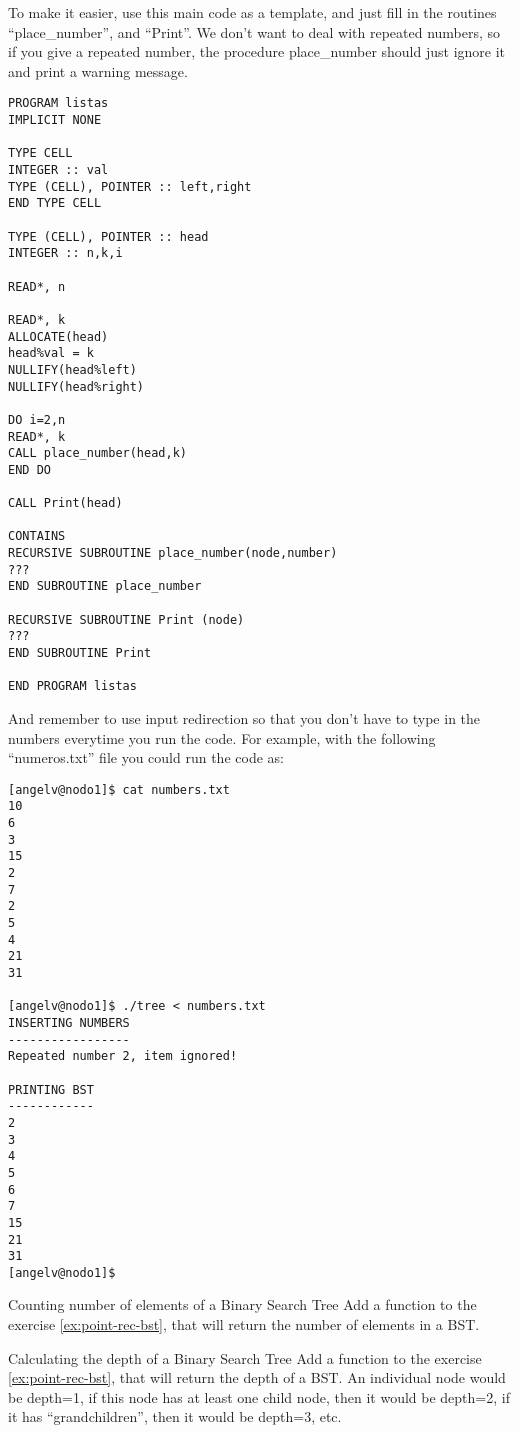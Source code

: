 To make it easier, use this main code as a template, and just fill in the
routines ``place\_number'', and ``Print''. We don't want to deal with repeated
numbers, so if you give a repeated number, the procedure place\_number should
just ignore it and print a warning message.

\begin{verbatim}
PROGRAM listas
IMPLICIT NONE

TYPE CELL
INTEGER :: val
TYPE (CELL), POINTER :: left,right
END TYPE CELL

TYPE (CELL), POINTER :: head
INTEGER :: n,k,i

READ*, n

READ*, k
ALLOCATE(head)
head%val = k
NULLIFY(head%left)
NULLIFY(head%right)

DO i=2,n
READ*, k
CALL place_number(head,k)
END DO

CALL Print(head)

CONTAINS 
RECURSIVE SUBROUTINE place_number(node,number)
???
END SUBROUTINE place_number

RECURSIVE SUBROUTINE Print (node) 
???
END SUBROUTINE Print

END PROGRAM listas
\end{verbatim}

And remember to use input redirection so that you don't have to type in the
numbers everytime you run the code. For example, with the following
``numeros.txt'' file you could run the code as:

\begin{verbatim}
[angelv@nodo1]$ cat numbers.txt
10
6
3
15
2
7
2
5
4
21
31

[angelv@nodo1]$ ./tree < numbers.txt
INSERTING NUMBERS
-----------------
Repeated number 2, item ignored!

PRINTING BST
------------
2
3
4
5
6
7
15
21
31
[angelv@nodo1]$
\end{verbatim}

 {Counting number of elements of a Binary Search Tree}
\label{ex:point-rec-nnodes-bst}
Add a function to the exercise \ref{ex:point-rec-bst}, that will return the
number of elements in a BST.

 {Calculating the depth of a Binary Search Tree}
\label{ex:point-rec-depth-bst}
Add a function to the exercise \ref{ex:point-rec-bst}, that will return the
depth of a BST. An individual node would be depth=1, if this node has at least
one child node, then it would be depth=2, if it has ``grandchildren'', then it
would be depth=3, etc.

